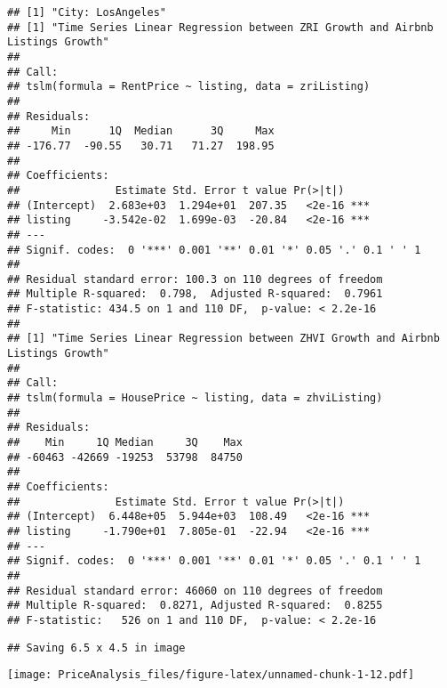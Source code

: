 \documentclass[
]{article}
\begin{document}
\begin{verbatim}
## [1] "City: LosAngeles"
## [1] "Time Series Linear Regression between ZRI Growth and Airbnb Listings Growth"
## 
## Call:
## tslm(formula = RentPrice ~ listing, data = zriListing)
## 
## Residuals:
##     Min      1Q  Median      3Q     Max 
## -176.77  -90.55   30.71   71.27  198.95 
## 
## Coefficients:
##               Estimate Std. Error t value Pr(>|t|)    
## (Intercept)  2.683e+03  1.294e+01  207.35   <2e-16 ***
## listing     -3.542e-02  1.699e-03  -20.84   <2e-16 ***
## ---
## Signif. codes:  0 '***' 0.001 '**' 0.01 '*' 0.05 '.' 0.1 ' ' 1
## 
## Residual standard error: 100.3 on 110 degrees of freedom
## Multiple R-squared:  0.798,  Adjusted R-squared:  0.7961 
## F-statistic: 434.5 on 1 and 110 DF,  p-value: < 2.2e-16
## 
## [1] "Time Series Linear Regression between ZHVI Growth and Airbnb Listings Growth"
## 
## Call:
## tslm(formula = HousePrice ~ listing, data = zhviListing)
## 
## Residuals:
##    Min     1Q Median     3Q    Max 
## -60463 -42669 -19253  53798  84750 
## 
## Coefficients:
##               Estimate Std. Error t value Pr(>|t|)    
## (Intercept)  6.448e+05  5.944e+03  108.49   <2e-16 ***
## listing     -1.790e+01  7.805e-01  -22.94   <2e-16 ***
## ---
## Signif. codes:  0 '***' 0.001 '**' 0.01 '*' 0.05 '.' 0.1 ' ' 1
## 
## Residual standard error: 46060 on 110 degrees of freedom
## Multiple R-squared:  0.8271, Adjusted R-squared:  0.8255 
## F-statistic:   526 on 1 and 110 DF,  p-value: < 2.2e-16
\end{verbatim}

\begin{verbatim}
## Saving 6.5 x 4.5 in image
\end{verbatim}

\texttt{[image: PriceAnalysis\_files/figure-latex/unnamed-chunk-1-12.pdf]}
\end{document}
